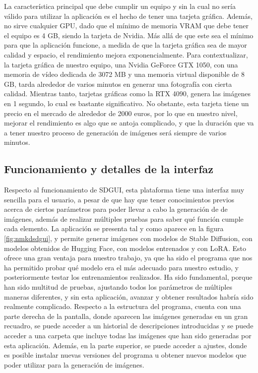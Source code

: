 La característica principal que debe cumplir un equipo y sin la cual no sería válido para utilizar la aplicación es el hecho de tener una tarjeta gráfica. Además, no sirve cualquier GPU, dado que el mínimo de memoria VRAM que debe tener el equipo es 4 GB, siendo la tarjeta de Nvidia. Más allá de que este sea el mínimo para que la aplicación funcione, a medida de que la tarjeta gráfica sea de mayor calidad y espacio, el rendimiento mejora exponencialmente. Para contextualizar, la tarjeta gráfica de nuestro equipo, una Nvidia GeForce GTX 1050, con una memoria de vídeo dedicada de 3072 MB y una memoria virtual disponible de 8 GB, tarda alrededor de varios minutos en generar una fotografía con cierta calidad. Mientras tanto, tarjetas gráficas como la RTX 4090, genera las imágenes en 1 segundo, lo cual es bastante significativo. No obstante, esta tarjeta tiene un precio en el mercado de alrededor de 2000 euros, por lo que en nuestro nivel, mejorar el rendimiento es algo que se antoja complicado, y que la duración que va a tener nuestro proceso de generación de imágenes será siempre de varios minutos.\\


\subsection{Funcionamiento y detalles de la interfaz}

Respecto al funcionamiento de SDGUI, esta plataforma tiene una interfaz muy sencilla para el usuario, a pesar de que hay que tener conocimientos previos acerca de ciertos parámetros para poder llevar a cabo la generación de de imágenes, además de realizar múltiples pruebas para saber qué función cumple cada elemento. La aplicación se presenta tal y como aparece en la figura \ref{fig:nmkdsdgui}, y permite generar imágenes con modelos de Stable Diffusion, con modelos obtenidos de Hugging Face, con modelos entrenados y con LoRA. Esto ofrece una gran ventaja para nuestro trabajo, ya que ha sido el programa que nos ha permitido probar qué modelo era el más adecuado para nuestro estudio, y posteriormente testar los entrenamientos realizados. Ha sido fundamental, porque han sido multitud de pruebas, ajustando todos los parámetros de múltiples maneras diferentes, y sin esta aplicación, avanzar y obtener resultados habría sido realmente complicado. Respecto a la estructura del programa, cuenta con una parte derecha de la pantalla, donde aparecen las imágenes generadas en un gran recuadro, se puede acceder a un historial de descripciones introducidas y se puede acceder a una carpeta que incluye todas las imágenes que han sido generadas por esta aplicación. Además, en la parte superior, se puede acceder a ajustes, donde es posible instalar nuevas versiones del programa u obtener nuevos modelos que poder utilizar para la generación de imágenes. \\



